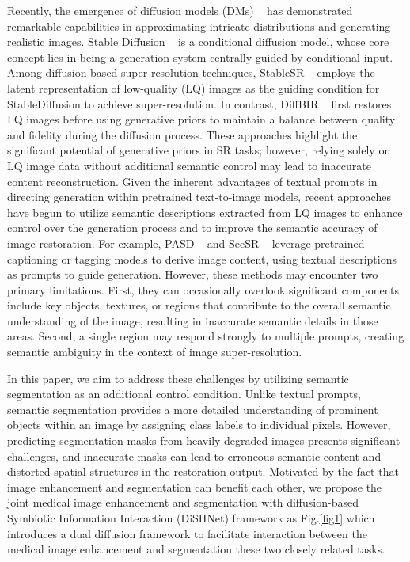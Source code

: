 \documentclass{article}
\begin{document}
Recently, the emergence of diffusion models (DMs) ~\cite{ho2020denoising} has demonstrated remarkable capabilities in approximating intricate distributions and generating realistic images. Stable Diffusion ~\cite{rombach2022high} is a conditional diffusion model, whose core concept lies in being a generation system centrally guided by conditional input. Among diffusion-based super-resolution techniques, StableSR ~\cite{wang2023exploring} employs the latent representation of low-quality (LQ) images as the guiding condition for StableDiffusion to achieve super-resolution. In contrast, DiffBIR ~\cite{lin2024diffbir} first restores LQ images before using generative priors to maintain a balance between quality and fidelity during the diffusion process. These approaches highlight the significant potential of generative priors in SR tasks; however, relying solely on LQ image data without additional semantic control may lead to inaccurate content reconstruction. Given the inherent advantages of textual prompts in directing generation within pretrained text-to-image models, recent approaches have begun to utilize semantic descriptions extracted from LQ images to enhance control over the generation process and to improve the semantic accuracy of image restoration. For example, PASD ~\cite{yang2024pixel} and SeeSR ~\cite{wu2024seesr} leverage pretrained captioning or tagging models to derive image content, using textual descriptions as prompts to guide generation. However, these methods may encounter two primary limitations. First, they can occasionally overlook significant components include key objects, textures, or regions that contribute to the overall semantic understanding of the image, resulting in inaccurate semantic details in those areas. Second, a single region may respond strongly to multiple prompts, creating semantic ambiguity in the context of image super-resolution. 

In this paper, we aim to address these challenges by utilizing semantic segmentation as an additional control condition. Unlike textual prompts, semantic segmentation provides a more detailed understanding of prominent objects within an image by assigning class labels to individual pixels. However, predicting segmentation masks from heavily degraded images presents significant challenges, and inaccurate masks can lead to erroneous semantic content and distorted spatial structures in the restoration output. Motivated by the fact that image enhancement and segmentation can benefit each other, we propose the joint medical image enhancement and segmentation with diffusion-based Symbiotic Information Interaction (DiSIINet) framework as Fig.\ref{fig1} which introduces a dual diffusion framework to facilitate interaction between the medical image enhancement and segmentation these two closely related tasks. 
\end{document}
